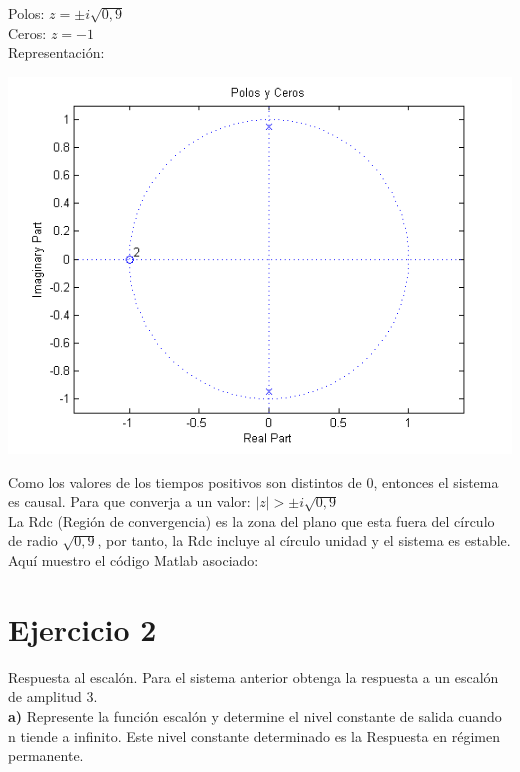 \documentclass[a4paper,12pt]{article}
\begin{document}
Polos: $z = \pm i \sqrt{0,9}$ \\

Ceros: $z = -1$ \\

Representación: \\
\begin{center}
\includegraphics[width=.8 \textwidth]{polos-ceros-ejercicio1.png}
\end{center}

Como los valores de los tiempos positivos son distintos de 0, entonces el sistema es causal. Para que converja a un valor: $ |z| > \pm i \sqrt{0,9} $ \\

La Rdc (Región de convergencia) es la zona del plano que esta fuera del círculo de radio $\sqrt{0,9}$, por tanto, la Rdc incluye al círculo unidad y el sistema es estable. \\

Aquí muestro el código Matlab asociado:\\


\section{Ejercicio 2}
Respuesta al escalón. Para el sistema anterior obtenga la respuesta a un escalón de amplitud 3.\\

\textbf{a)} Represente la función escalón y determine el nivel constante de salida cuando n tiende a infinito. Este nivel constante determinado es la Respuesta en régimen permanente. \\
\end{document}
